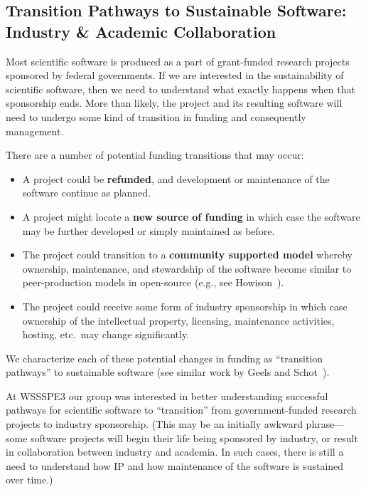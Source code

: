 \subsection{Transition Pathways to Sustainable Software: Industry \& Academic Collaboration} 


Most scientific software is produced as a part of grant-funded research projects
sponsored by federal governments. If we are interested in the sustainability of
scientific software, then we need to understand what exactly happens when that
sponsorship ends. More than likely, the project and its resulting software will
need to undergo some kind of transition in funding and consequently management.

There are a number of potential funding transitions that may occur:  
%
\begin{itemize}

\item A project could be \textbf{refunded}, and development or maintenance of
the software continue as planned.

\item A project might locate a \textbf{new source of funding} in which case the
software may be further developed or simply maintained as before.

\item The project could transition to a \textbf{community supported model}
whereby ownership, maintenance, and stewardship of the software become similar
to peer-production models in open-source (e.g., see
Howison~\cite{howison_sustaining_2015}).

\item The project could receive some form of industry sponsorship in which case
ownership of the intellectual property, licensing, maintenance activities,
hosting, etc.\ may change significantly.

\end{itemize}

We characterize each of these potential changes in funding as ``transition
pathways'' to sustainable software (see similar work by Geels and
Schot~\cite{Geels:2007}).

At WSSSPE3 our group was interested in better understanding successful pathways
for scientific software to ``transition'' from government-funded research
projects to industry sponsorship. (This may be an initially awkward
phrase---some software projects will begin their life being sponsored by
industry, or result in collaboration between industry and academia. In such
cases, there is still a need to understand how IP and how maintenance of the
software is sustained over time.)

